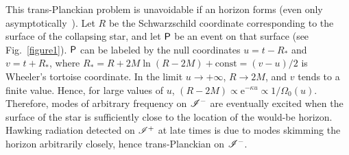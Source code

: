 \documentclass[groupedaddress, showpacs, showkeys, onecolumn, nofootinbib, 12pt]{revtex4}
\begin{document}
This trans-Planckian problem is unavoidable if an horizon forms (even only asymptotically~\cite{Barcelo:2006np, Barcelo:2006uw}).  Let $R$ be the Schwarzschild coordinate corresponding to the surface of the collapsing star, and let $\sf P$ be an event on that surface (see Fig.~\ref{figure1}).  $\sf P$ can be labeled by the null coordinates $u=t-R_\ast$ and $v=t+R_\ast$, where $R_\ast=R+2M\ln\left(R-2M\right)+\mbox{const}=\left(v-u\right)/2$ is Wheeler's tortoise coordinate.  In the limit $u\to +\infty$, $R\to 2M$, and $v$ tends to a finite value.  Hence, for large values of $u$, $(R-2M)\propto \mathrm{e}^{-\kappa u}\propto 1/\Omega_0(u)$. Therefore, modes of arbitrary frequency on $\mathscr{I}^-$ are eventually excited when the surface of the star is sufficiently close to the location of the would-be horizon.  Hawking radiation detected on $\mathscr{I}^+$ at late times is due to modes skimming the horizon arbitrarily closely, hence trans-Planckian on $\mathscr{I}^-$.
\end{document}
